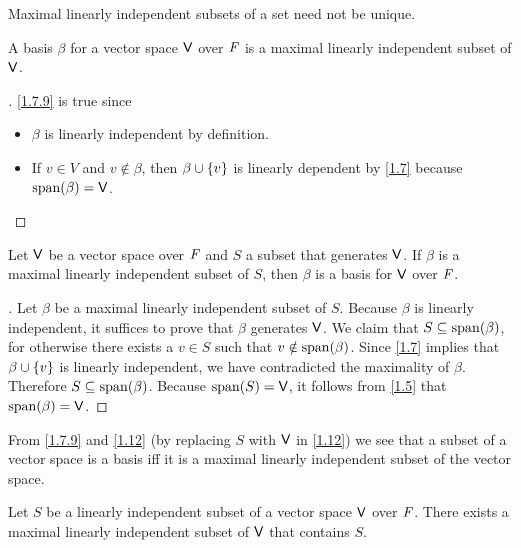 \begin{note}
	Maximal linearly independent subsets of a set need not be unique.
\end{note}

\begin{eg}\label{1.7.9}
	A basis \(\beta\) for a vector space \(\mathsf{V}\) over \(\mathit{F}\) is a maximal linearly independent subset of \(\mathsf{V}\).
\end{eg}

\begin{proof}[]
	\cref{1.7.9} is true since
	\begin{itemize}
		\item \(\beta\) is linearly independent by definition.
		\item If \(v \in V\) and \(v \notin \beta\), then \(\beta \cup \left\lbrace v\right\rbrace\) is linearly dependent by \cref{1.7} because \(\spn{\beta} = \V\).
	\end{itemize}
\end{proof}

\begin{thm}\label{1.12}
	Let \(\mathsf{V}\) be a vector space over \(\mathit{F}\) and \(S\) a subset that generates \(\mathsf{V}\).
	If \(\beta\) is a maximal linearly independent subset of \(S\), then \(\beta\) is a basis for \(\mathsf{V}\) over \(\mathit{F}\).
\end{thm}

\begin{proof}[]
	Let \(\beta\) be a maximal linearly independent subset of \(S\).
	Because \(\beta\) is linearly independent, it suffices to prove that \(\beta\) generates \(\mathsf{V}\).
	We claim that \(S \subseteq \spn{\beta}\), for otherwise there exists a \(v \in S\) such that \(v \notin \spn{\beta}\).
	Since \cref{1.7} implies that \(\beta \cup \left\lbrace v\right\rbrace\) is linearly independent, we have contradicted the maximality of \(\beta\).
	Therefore \(S \subseteq \spn{\beta}\).
	Because \(\spn{S} = \V\), it follows from \cref{1.5} that \(\spn{\beta} = \V\).
\end{proof}

\begin{note}
	From \cref{1.7.9} and \cref{1.12} (by replacing \(S\) with \(\mathsf{V}\) in \cref{1.12}) we see that a subset of a vector space is a basis iff it is a maximal linearly independent subset of the vector space.
\end{note}

\begin{thm}\label{1.13}
	Let \(S\) be a linearly independent subset of a vector space \(\mathsf{V}\) over \(\mathit{F}\).
	There exists a maximal linearly independent subset of \(\mathsf{V}\) that contains \(S\).
\end{thm}

